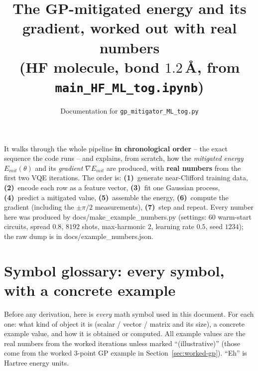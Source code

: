\documentclass[11pt]{article}
\title{\textbf{The GP-mitigated energy and its gradient, worked out with real numbers\\
(HF molecule, bond $1.2$\,\AA, from \texttt{main\_HF\_ML\_tog.ipynb})}}
\author{Documentation for \texttt{gp\_mitigator\_ML\_tog.py}}
\date{}
\def\bm#1{#1}%
\def\texttt#1{#1}%
\def\mathrm#1{#1}%
\newcommand{\Emit}{E_{\mathrm{mit}}}
\begin{document}
\maketitle

\begin{tcolorbox}[colback=blue!4!white,colframe=blue!50!black,title=\textbf{What this document does}]
It walks through the whole pipeline \textbf{in chronological order} -- the exact
sequence the code runs -- and explains, from scratch, how the \emph{mitigated
energy} $\Emit(\bm\theta)$ and its \emph{gradient} $\nabla\Emit$ are produced,
with \textbf{real numbers} from the first two VQE iterations. The order is:
\textbf{(1)}~generate near-Clifford training data, \textbf{(2)}~encode each row as
a feature vector, \textbf{(3)}~fit one Gaussian process, \textbf{(4)}~predict a
mitigated value, \textbf{(5)}~assemble the energy, \textbf{(6)}~compute the
gradient (including the $\pm\pi/2$ measurements), \textbf{(7)}~step and repeat.
Every number here was produced by \texttt{docs/make\_example\_numbers.py}
(settings: $60$ warm-start circuits, spread $0.8$, $8192$ shots, max-harmonic
$2$, learning rate $0.5$, seed $1234$); the raw dump is in
\texttt{docs/example\_numbers.json}.
\end{tcolorbox}

\section{Symbol glossary: every symbol, with a concrete example}
\label{sec:glossary}

Before any derivation, here is \emph{every} math symbol used in this document.
For each one: what kind of object it is (scalar / vector / matrix and its size),
a concrete example value, and how it is obtained or computed. All example values
are the real numbers from the worked iterations unless marked
``(illustrative)'' (those come from the worked $3$-point GP example in
Section~\ref{sec:worked-gp}). ``Eh'' is Hartree energy units.
\end{document}
